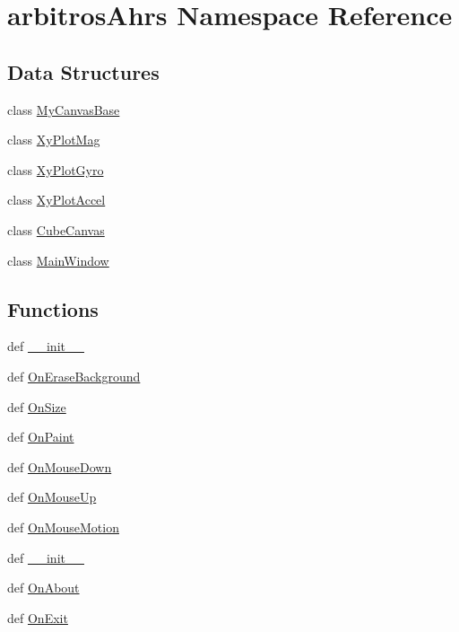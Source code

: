 \hypertarget{namespacearbitros_ahrs}{\section{arbitros\-Ahrs Namespace Reference}
\label{namespacearbitros_ahrs}
}
\subsection*{Data Structures}
\begin{DoxyCompactItemize}
\item 
class \hyperlink{classarbitros_ahrs_1_1_my_canvas_base}{My\-Canvas\-Base}
\item 
class \hyperlink{classarbitros_ahrs_1_1_xy_plot_mag}{Xy\-Plot\-Mag}
\item 
class \hyperlink{classarbitros_ahrs_1_1_xy_plot_gyro}{Xy\-Plot\-Gyro}
\item 
class \hyperlink{classarbitros_ahrs_1_1_xy_plot_accel}{Xy\-Plot\-Accel}
\item 
class \hyperlink{classarbitros_ahrs_1_1_cube_canvas}{Cube\-Canvas}
\item 
class \hyperlink{classarbitros_ahrs_1_1_main_window}{Main\-Window}
\end{DoxyCompactItemize}
\subsection*{Functions}
\begin{DoxyCompactItemize}
\item 
def \hyperlink{namespacearbitros_ahrs_aa7e66a28b4fde629c8e3aa3bccb387c8}{\-\_\-\-\_\-init\-\_\-\-\_\-}
\item 
def \hyperlink{namespacearbitros_ahrs_afea95920a8e8bad56c4a604870f3ccef}{On\-Erase\-Background}
\item 
def \hyperlink{namespacearbitros_ahrs_a78937e586f05fc9bb4b807a1f899dded}{On\-Size}
\item 
def \hyperlink{namespacearbitros_ahrs_acd2cd48133f855370869c2043a7a023d}{On\-Paint}
\item 
def \hyperlink{namespacearbitros_ahrs_a0542cfae1d397940a778dbeb9f04dbe8}{On\-Mouse\-Down}
\item 
def \hyperlink{namespacearbitros_ahrs_a3b78f1414f368ea38cb0202a1c04c1a0}{On\-Mouse\-Up}
\item 
def \hyperlink{namespacearbitros_ahrs_a85ce46aa4fa6cf86a0b375f2cd6a579a}{On\-Mouse\-Motion}
\item 
def \hyperlink{namespacearbitros_ahrs_aa7e66a28b4fde629c8e3aa3bccb387c8}{\-\_\-\-\_\-init\-\_\-\-\_\-}
\item 
def \hyperlink{namespacearbitros_ahrs_af942b609ba533337a1228c450dd57fb7}{On\-About}
\item 
def \hyperlink{namespacearbitros_ahrs_a022d39d696f9dc9072ec10ab3680ae14}{On\-Exit}
\end{DoxyCompactItemize}
